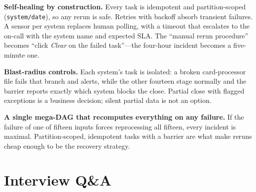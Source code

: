 \textbf{Self-healing by construction.} Every task is idempotent and partition-scoped (\texttt{system/date}), so any rerun is safe. Retries with backoff absorb transient failures. A sensor per system replaces human polling, with a timeout that escalates to the on-call with the system name and expected SLA. The ``manual rerun procedure'' becomes ``click \emph{Clear} on the failed task''---the four-hour incident becomes a five-minute one.

\textbf{Blast-radius controls.} Each system's task is isolated: a broken card-processor file fails that branch and alerts, while the other fourteen stage normally and the barrier reports exactly which system blocks the close. Partial close with flagged exceptions is a business decision; silent partial data is not an option.

\begin{pitfall}
\textbf{A single mega-DAG that recomputes everything on any failure.} If the failure of one of fifteen inputs forces reprocessing all fifteen, every incident is maximal. Partition-scoped, idempotent tasks with a barrier are what make reruns cheap enough to be the recovery strategy.
\end{pitfall}

\section{Interview Q\&A}
